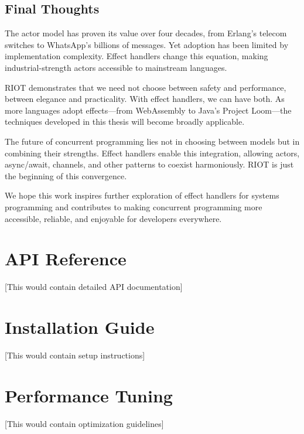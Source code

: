 \documentclass[12pt,a4paper]{report}
\begin{document}
\section{Final Thoughts}

The actor model has proven its value over four decades, from Erlang's telecom switches to WhatsApp's billions of messages. Yet adoption has been limited by implementation complexity. Effect handlers change this equation, making industrial-strength actors accessible to mainstream languages.

RIOT demonstrates that we need not choose between safety and performance, between elegance and practicality. With effect handlers, we can have both. As more languages adopt effects—from WebAssembly to Java's Project Loom—the techniques developed in this thesis will become broadly applicable.

The future of concurrent programming lies not in choosing between models but in combining their strengths. Effect handlers enable this integration, allowing actors, async/await, channels, and other patterns to coexist harmoniously. RIOT is just the beginning of this convergence.

We hope this work inspires further exploration of effect handlers for systems programming and contributes to making concurrent programming more accessible, reliable, and enjoyable for developers everywhere.

\appendix

\chapter{API Reference}

[This would contain detailed API documentation]

\chapter{Installation Guide}

[This would contain setup instructions]

\chapter{Performance Tuning}

[This would contain optimization guidelines]



\end{document}
